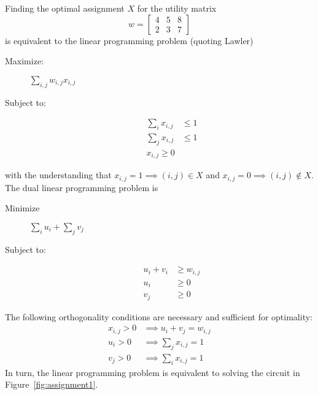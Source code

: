\documentclass[11pt]{article}
\begin{document}
Finding the optimal assignment $X$ for the utility matrix
\begin{equation*}
  w =
  \begin{bmatrix}
    4 & 5 & 8 \\
    2 & 3 & 7
  \end{bmatrix}
\end{equation*}
is equivalent to the linear programming problem (quoting Lawler)
\begin{description}
\item[Maximize:] $\sum_{i,j} w_{i,j} x_{i,j}$
\item[Subject to:]
  \begin{align*}
    \sum_i x_{i,j} &\leq 1 \\
    \sum_j x_{i,j} &\leq 1 \\
    x_{i,j} \geq 0
  \end{align*}
\end{description}
with the understanding that $x_{i,j} = 1 \implies (i,j)\in X$ and
$x_{i,j} = 0 \implies (i,j)\notin X$.
The dual linear programming problem is
\begin{description}
\item[Minimize] $\sum_i u_i + \sum_j v_j$
\item[Subject to:]
  \begin{align*}
    u_i + v_i &\geq w_{i,j} \\
    u_i & \geq 0 \\
    v_j & \geq 0
  \end{align*}
\end{description}
The following orthogonality conditions are necessary and sufficient
for optimality:
\begin{align*}
  x_{i,j} > 0 & \implies u_i + v_j = w_{i,j}\\
  u_i > 0 & \implies \sum_j x_{i,j} = 1\\
  v_j > 0 & \implies \sum_i x_{i,j} = 1
\end{align*}
In turn, the linear programming problem is equivalent to solving the
circuit in Figure~\ref{fig:assignment1}.
\begin{figure*}
  \centering
  \caption{Circuit equivalent of assignment problem}
  \label{fig:assignment1}
\end{figure*}
\end{document}
